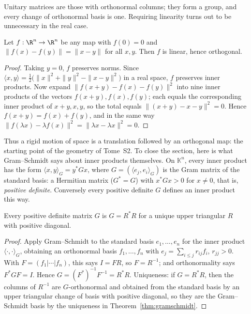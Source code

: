 Unitary matrices are those with orthonormal columns; they form a group, and every change of orthonormal basis is one.
Requiring linearity turns out to be unnecessary in the real case.

\begin{theorem}\label{thm:isometry}
Let $f:\R^n\to\R^n$ be any map with $f(0)=0$ and $\|f(x)-f(y)\|=\|x-y\|$ for all $x,y$. Then $f$ is linear, hence
orthogonal.
\end{theorem}
\begin{proof}
Taking $y=0$, $f$ preserves norms. Since $\langle x,y\rangle=\frac12\bigl(\|x\|^2+\|y\|^2-\|x-y\|^2\bigr)$ in a real space,
$f$ preserves inner products. Now expand $\|f(x+y)-f(x)-f(y)\|^2$ into nine inner products of the vectors
$f(x+y),f(x),f(y)$; each equals the corresponding inner product of $x+y,x,y$, so the total equals
$\|(x+y)-x-y\|^2=0$. Hence $f(x+y)=f(x)+f(y)$, and in the same way $\|f(\lambda x)-\lambda f(x)\|^2=\|\lambda x-\lambda
x\|^2=0$.
\end{proof}

Thus a rigid motion of space is a translation followed by an orthogonal map: the starting point of the geometry of
Tome~S2. To close the section, here is what Gram--Schmidt says about inner products themselves. On $\mathbb K^n$, every
inner product has the form $\langle x,y\rangle_G=y^*Gx$, where $G=(\langle e_j,e_i\rangle_G)$ is the Gram matrix of the
standard basis: a Hermitian matrix ($G^*=G$) with $x^*Gx>0$ for $x\ne0$, that is, \emph{positive definite}. Conversely
every positive definite $G$ defines an inner product this way.

\begin{corollary}\label{cor:cholesky}
Every positive definite matrix $G$ is $G=R^*R$ for a unique upper triangular $R$ with positive diagonal.
\end{corollary}
\begin{proof}
Apply Gram--Schmidt to the standard basis $e_1,\dots,e_n$ for the inner product $\langle\cdot,\cdot\rangle_G$, obtaining
an orthonormal basis $f_1,\dots,f_n$ with $e_j=\sum_{i\le j}r_{ij}f_i$, $r_{jj}>0$. With $F=(f_1|\cdots|f_n)$, this says
$I=FR$, so $F=R^{-1}$; and orthonormality says $F^*GF=I$. Hence $G=(F^*)^{-1}F^{-1}=R^*R$. Uniqueness: if $G=R^*R$, then
the columns of $R^{-1}$ are $G$-orthonormal and obtained from the standard basis by an upper triangular change of
basis with positive diagonal, so they are the Gram--Schmidt basis by the uniqueness in Theorem~\ref{thm:gramschmidt}.
\end{proof}

